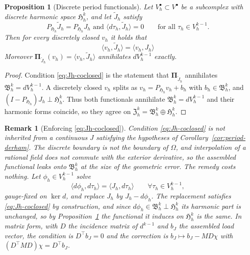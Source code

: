 \documentclass{article}
\newtheorem{proposition}{Proposition}[section]
\newtheorem{remark}{Remark}[section]
\newcommand{\f}[1]{\mathfrak{#1}}
\newcommand{\HH}{\mathfrak H}
\newcommand{\Piop}{\boldsymbol\Pi}
\newcommand{\ip}[2]{\langle #1,#2\rangle}
\begin{document}
\begin{proposition}[Discrete period functionals]\label{prop:discrete-period}
Let $V_h^{\bullet}\subset V^{\bullet}$ be a subcomplex with discrete harmonic
space $\HH_h^{k}$, and let $\tilde{J}_h$ satisfy
\begin{equation}\label{eq:Jh-coclosed}
 P_{\HH_h}\tilde J_h=P_{\HH_h} J_h\text{ and }\ip{d\tau_h}{\tilde J_h}=0\qquad\text{for all }\tau_h\in V_h^{k-1}.
\end{equation}
Then for every discretely closed $v_h$ it holds that 
\begin{equation}\label{eq:discrete-period-both}
    \ip{v_h}{\tilde J_h} = \ip{v_h}{J_h}
\end{equation}
Moreover $\Piop_{\tilde J_h}(v_h)=\ip{v_h}{\tilde J_h}$ annihilates $dV_h^{k-1}$ exactly.
\end{proposition}
\begin{proof}

Condition \eqref{eq:Jh-coclosed} is the statement that $\Piop_{\tilde J_h}$ annihilates
$\f B_h^{k}=dV_h^{k-1}$. A discretely closed $v_h$ splits as
$v_h=P_{\HH_h}v_h+b_h$ with $b_h\in\f B_h^{k}$, and
$(I-P_{\HH_h})J_h\perp\HH_h^{k}$. 
Thus both functionals annihilate $\f B_h^k=dV^{k-1}_h$ and their harmonic forms coincide, so they agree on $\f Z^k_h=\f B^k_h\oplus \HH^k_h$.
\end{proof}

\begin{remark}[Enforcing \eqref{eq:Jh-coclosed}]\label{rem:leray}
Condition \eqref{eq:Jh-coclosed} is not inherited from a continuous $J$
satisfying the hypotheses of Corollary~\ref{cor:period-derham}. The discrete
boundary is not the boundary of $\Omega$, and interpolation of a rational field
does not commute with the exterior derivative, so the assembled functional
leaks onto $\f B_h^{k}$ at the size of the geometric error. The remedy costs
nothing. Let $\phi_h\in V_h^{k-1}$ solve
\[
 \ip{d\phi_h}{d\tau_h}=\ip{J_h}{d\tau_h}\qquad\forall\tau_h\in V_h^{k-1},
\]
gauge-fixed on $\ker d$, and replace $J_h$ by $J_h-d\phi_h$. The replacement
satisfies \eqref{eq:Jh-coclosed} by construction, and since
$d\phi_h\in\f B_h^{k}\perp\HH_h^{k}$ its harmonic part is unchanged, so by
Proposition~\ref{prop:discrete-period} the functional it induces on
$\HH_h^{k}$ is the same. In matrix form, with $D$ the incidence matrix of
$d^{k-1}$ and $b_J$ the assembled load vector, the condition is
$D^{\top}b_J=0$ and the correction is $b_J\mapsto b_J-MD\chi$ with
$(D^{\top}MD)\chi=D^{\top}b_J$.
\end{remark}
\end{document}
